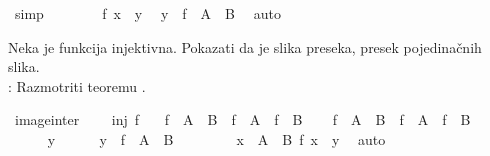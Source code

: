 \begin{isabellebody}
\begin{exercise}[subtitle=Svojstva funkcija]
\ simp\isanewline
\ \ \ \ \ \ \isamarkupfalse%
\ {\isacartoucheopen}f\ x\ {\isacharequal}{\kern0pt}\ y{\isacartoucheclose}\ \isamarkupfalse%
\ {\isachardoublequoteopen}y\ {\isasymin}\ f\ {\isacharbackquote}{\kern0pt}\ {\isacharparenleft}{\kern0pt}A\ {\isasymunion}\ B{\isacharparenright}{\kern0pt}{\isachardoublequoteclose}\ \isamarkupfalse%
\ auto\isanewline
\ \ \ \ \isamarkupfalse%
\isanewline
\ \ \isamarkupfalse%
\isanewline
{}\isamarkupfalse%
%
\endisatagproof
{\isafoldproof}%
%
\isadelimproof
%
\endisadelimproof
%
\begin{isamarkuptext}%
Neka je funkcija  injektivna. 
      Pokazati da je slika preseka, presek pojedinačnih slika.\\
      : Razmotriti teoremu .%
\end{isamarkuptext}\isamarkuptrue%
\isamarkupfalse%
\ image{\isacharunderscore}{\kern0pt}inter{\isacharcolon}{\kern0pt}\ \isanewline
\ \ \ {\isachardoublequoteopen}inj\ f{\isachardoublequoteclose}\isanewline
\ \ \ {\isachardoublequoteopen}f\ {\isacharbackquote}{\kern0pt}\ {\isacharparenleft}{\kern0pt}A\ {\isasyminter}\ B{\isacharparenright}{\kern0pt}\ {\isacharequal}{\kern0pt}\ f\ {\isacharbackquote}{\kern0pt}\ A\ {\isasyminter}\ f\ {\isacharbackquote}{\kern0pt}\ B{\isachardoublequoteclose}\isanewline
%
\isadelimproof
%
\endisadelimproof
%
\isatagproof
{}\isamarkupfalse%
\isanewline
\ \ \isamarkupfalse%
\ {\isachardoublequoteopen}f\ {\isacharbackquote}{\kern0pt}\ {\isacharparenleft}{\kern0pt}A\ {\isasyminter}\ B{\isacharparenright}{\kern0pt}\ {\isasymsubseteq}\ f\ {\isacharbackquote}{\kern0pt}\ A\ {\isasyminter}\ f\ {\isacharbackquote}{\kern0pt}\ B{\isachardoublequoteclose}\isanewline
\ \ \isamarkupfalse%
\isanewline
\ \ \ \ \isamarkupfalse%
\ y\isanewline
\ \ \ \ \isamarkupfalse%
\ {\isachardoublequoteopen}y\ {\isasymin}\ f\ {\isacharbackquote}{\kern0pt}\ {\isacharparenleft}{\kern0pt}A\ {\isasyminter}\ B{\isacharparenright}{\kern0pt}{\isachardoublequoteclose}\isanewline
\ \ \ \ \isamarkupfalse%
\ \isamarkupfalse%
\ {\isachardoublequoteopen}{\isasymexists}\ x\ {\isasymin}\ A\ {\isasyminter}\ B{\isachardot}{\kern0pt}\ f\ x\ {\isacharequal}{\kern0pt}\ y{\isachardoublequoteclose}\ \isamarkupfalse%
\ auto\isanewline
\ \ \ \ \isamarkupfalse%

\end{exercise}
\end{isabellebody}
